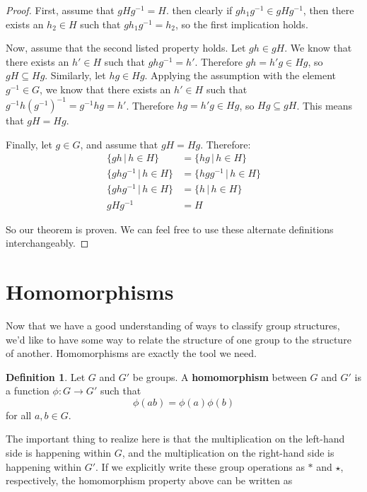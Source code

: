 \documentclass[12pt]{article}
\newcommand{\inv}[1]{#1^{-1}}
\theoremstyle{definition}
\theoremstyle{definition}
\newtheorem{definition}[theorem]{Definition}
\theoremstyle{definition}
\theoremstyle{definition}
\begin{document}
\begin{proof}
First, assume that $gH\inv{g} = H$. then clearly if $gh_1\inv{g} \in gH\inv{g}$, then there exists an $h_2 \in H$ such that $gh_1\inv{g} = h_2$, so the first implication holds.

Now, assume that the second listed property holds. Let $gh \in gH$. We know that there exists an $h' \in H$ such that $gh\inv{g} = h'$. Therefore $gh = h'g \in Hg$, so $gH \subseteq Hg$. Similarly, let $hg \in Hg$. Applying the assumption with the element $\inv{g} \in G$, we know that there exists an $h' \in H$ such that $\inv{g}h\left(\inv{g}\right)^{-1} = \inv{g}hg = h'$. Therefore $hg = h'g \in Hg$, so $Hg \subseteq gH$. This means that $gH = Hg$.

Finally, let $g \in G$, and assume that $gH = Hg$. Therefore:
\begin{align*}
    \{gh \,|\, h \in H\} &= \{hg \,|\, h \in H\} \\
    \{ghg^{-1} \,|\, h \in H\} &= \{hgg^{-1} \,|\, h \in H\} \\
    \{ghg^{-1} \,|\, h \in H\} &= \{h \,|\, h \in H\} \\
    gHg^{-1} &= H
\end{align*}

So our theorem is proven. We can feel free to use these alternate definitions interchangeably.

\end{proof}

\section{Homomorphisms}

Now that we have a good understanding of ways to classify group structures, we'd like to have some way to relate the structure of one group to the structure of another. Homomorphisms are exactly the tool we need. 

\begin{definition}
Let $G$ and $G'$ be groups. A \textbf{homomorphism} between $G$ and $G'$ is a function $\phi: G \to G'$ such that
\begin{equation*}
    \phi(ab) = \phi(a)\phi(b)
\end{equation*}
for all $a, b \in G$.
\end{definition}

The important thing to realize here is that the multiplication on the left-hand side is happening within $G$, and the multiplication on the right-hand side is happening within $G'$. If we explicitly write these group operations as $*$ and $\star$, respectively, the homomorphism property above can be written as
\end{document}
